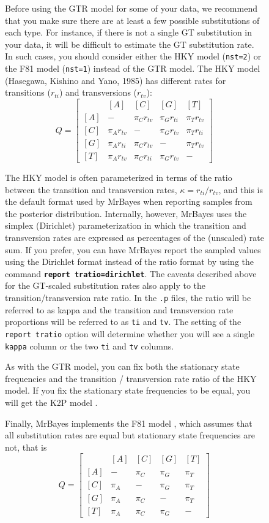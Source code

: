 \documentclass[12pt]{book}
\newcommand{\ttt}[1]{\texttt{#1}}
\newcommand{\tb}[1]{\ttt{\textbf{#1}}}
\begin{document}
\begin{figure}[h]
Before using the GTR model for some of your data, we recommend that you make sure there are at
least a few possible substitutions of each type. For instance, if there is not a single GT
substitution in your data, it will be difficult to estimate the GT substitution rate. In such
cases, you should consider either the HKY model (\ttt{nst=2}) or the F81 model (\ttt{nst=1})
instead of the GTR model. The HKY model (Hasegawa, Kishino and Yano, 1985) has different rates for
transitions ($r_{ti}$) and transversions ($r_{tv}$):
\[ Q=\begin{bmatrix} 
    & [A] & [C] & [G] & [T]\\
 [A]& - & \pi_C r_{tv} & \pi_G r_{ti} & \pi_T r_{tv}\\
 [C]& \pi_A r_{tv} & - & \pi_G r_{tv} & \pi_T r_{ti}\\
 [G]& \pi_A r_{ti} & \pi_C r_{tv} & - & \pi_T r_{tv}\\
 [T]& \pi_A r_{tv} & \pi_C r_{ti} & \pi_G r_{tv} & - 
\end{bmatrix}
\]

The HKY model is often parameterized in terms of the ratio between the transition and transversion
rates, $\kappa = r_{ti}/r_{tv}$, and this is the default format used by MrBayes when reporting
samples from the posterior distribution. Internally, however, MrBayes uses the simplex (Dirichlet)
parameterization in which the transition and transversion rates are expressed as percentages of the
(unscaled) rate sum. If you prefer, you can have MrBayes report the sampled values using the
Dirichlet format instead of the ratio format by using the command \tb{report tratio=dirichlet}. The
caveats described above for the GT-scaled substitution rates also apply to the
transition/transversion rate ratio. In the \ttt{.p} files, the ratio will be referred to as kappa
and the transition and transversion rate proportions will be referred to as \ttt{ti} and \ttt{tv}.
The setting of the \ttt{report tratio} option will determine whether you will see a single
\ttt{kappa} column or the two \ttt{ti} and \ttt{tv} columns.

As with the GTR model, you can fix both the stationary state frequencies and the transition /
transversion rate ratio of the HKY model. If you fix the stationary state frequencies to be equal,
you will get the K2P model \citep{kimura80}.

Finally, MrBayes implements the F81 model \citep{felsenstein81}, which assumes that all
substitution rates are equal but stationary state frequencies are not, that is
\[
Q=\begin{bmatrix}
    & [A] & [C] & [G] & [T] \\
 [A]& - & \pi_C & \pi_G & \pi_T\\
 [C]& \pi_A & - & \pi_G &\pi_T \\
 [G]& \pi_A & \pi_C& - & \pi_T\\
 [T]& \pi_A & \pi_C&\pi_G  & -
\end{bmatrix}
\]


\end{figure}
\end{document}
